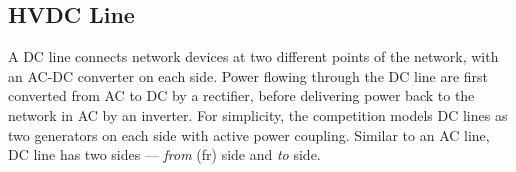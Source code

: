 \subsection{HVDC Line}
\label{sec:dcline}
A DC line connects network devices at two different points of the network, with an AC-DC converter on each side.
Power flowing through the DC line are first
converted from AC to DC by a rectifier, before delivering power 
back to the network in AC by an inverter.
For simplicity, the competition models DC lines as two generators 
on each side with active power coupling.
Similar to an AC line, DC line has two sides ---  \emph{from} (fr) side and \emph{to} side.
